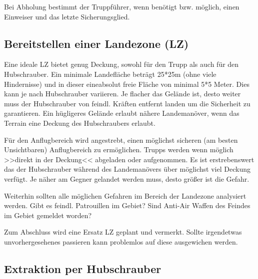Bei Abholung bestimmt der Truppführer, wenn benötigt bzw. möglich, einen Einweiser und das letzte Sicherungsglied.

\subsection{Bereitstellen einer Landezone (LZ)}

	Eine ideale LZ bietet genug Deckung, sowohl für den Trupp als auch für den Hubschrauber. Ein minimale Landefläche beträgt 25*25m (ohne viele Hindernisse) und in dieser eineabsolut freie Fläche von minimal 5*5 Meter. Dies kann je nach Hubschrauber variieren. Je flacher das Gelände ist, desto weiter muss der Hubschrauber von feindl. Kräften entfernt landen um die Sicherheit zu garantieren. Ein hügligeres Gelände erlaubt nähere Landemanöver, wenn das Terrain eine Deckung des Hubschraubers erlaubt.

	Für den Anflugbereich wird angestrebt, einen möglichst sicheren (am besten Unsichtbaren) Anflugbereich zu ermöglichen. Trupps werden wenn möglich >>direkt in der Deckung<< abgeladen oder aufgenommen. Es ist erstrebenswert das der Hubschrauber während des Landemanövers über möglichst viel Deckung verfügt. Je näher am Gegner gelandet werden muss, desto größer ist die Gefahr.

	Weiterhin sollten alle möglichen Gefahren im Bereich der Landezone analysiert werden. Gibt es feindl. Patrouillen im Gebiet? Sind Anti-Air Waffen des Feindes im Gebiet gemeldet worden?

	Zum Abschluss wird eine Ersatz LZ geplant und vermerkt. Sollte irgendetwas unvorhergesehenes passieren kann problemlos auf diese ausgewichen werden.

\subsection{Extraktion per Hubschrauber}

